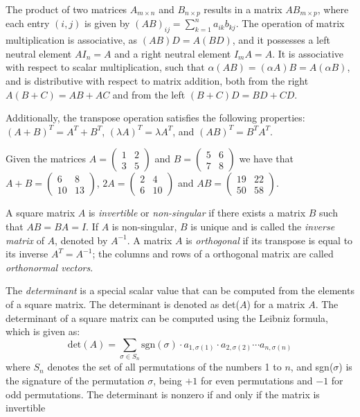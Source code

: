 The product of two matrices $A_{m \times n}$ and $B_{n \times p}$ results in a matrix $AB_{m \times p}$, where each entry $(i, j)$ is given by $(AB)_{ij} = \sum_{k=1}^n a_{ik} b_{kj}$. The operation of matrix multiplication is associative, as $(A B) D = A (B D)$, and it possesses a left neutral element $A I_n = A$ and a right neutral element $I_m A = A$. It is associative with respect to scalar multiplication, such that $\alpha (A B) = (\alpha A) B = A (\alpha B)$, and is distributive with respect to matrix addition, both from the right $A (B + C) = AB + AC$ and from the left $(B + C) D = B D + C D$. 

Additionally, the transpose operation satisfies the following properties: $(A + B)^T = A^T + B^T$, $(\lambda A)^T = \lambda A^T$, and $(A B)^T = B^T A^T$.

\begin{example}
Given the matrices $A = \left( \begin{smallmatrix} 1 & 2 \\ 3 & 5 \end{smallmatrix} \right)$ and $B = \left( \begin{smallmatrix} 5 & 6 \\ 7 & 8 \end{smallmatrix} \right)$ we have that $A + B = \left( \begin{smallmatrix} 6 & 8 \\ 10 & 13 \end{smallmatrix} \right)$, $2 A = \left( \begin{smallmatrix} 2 & 4 \\ 6 & 10 \end{smallmatrix} \right)$ and $A B = \left( \begin{smallmatrix} 19 & 22 \\ 50 & 58 \end{smallmatrix} \right)$.
\end{example}

A square matrix $A$ is \emph{invertible} or \emph{non-singular} if there exists a matrix $B$ such that $AB = BA = I$. If $A$ is non-singular, $B$ is unique and is called the \emph{inverse matrix} of $A$, denoted by $A^{-1}$. A matrix $A$ is \emph{orthogonal} if its transpose is equal to its inverse $A^T = A^{-1}$; the columns and rows of a orthogonal matrix are called \emph{orthonormal vectors}.

The \emph{determinant} is a special scalar value that can be computed from the elements of a square matrix. The determinant is denoted as det($A$) for a matrix $A$. The determinant of a square matrix can be computed using the Leibniz formula, which is given as:
\[
\text{det}(A) = \sum_{\sigma \in S_n} \text{sgn}(\sigma) \cdot a_{1,\sigma(1)} \cdot a_{2,\sigma(2)} \cdots a_{n,\sigma(n)}
\]
where $S_n$ denotes the set of all permutations of the numbers 1 to $n$, and sgn($\sigma$) is the signature of the permutation $\sigma$, being $+1$ for even permutations and $-1$ for odd permutations. The determinant is nonzero if and only if the matrix is invertible

